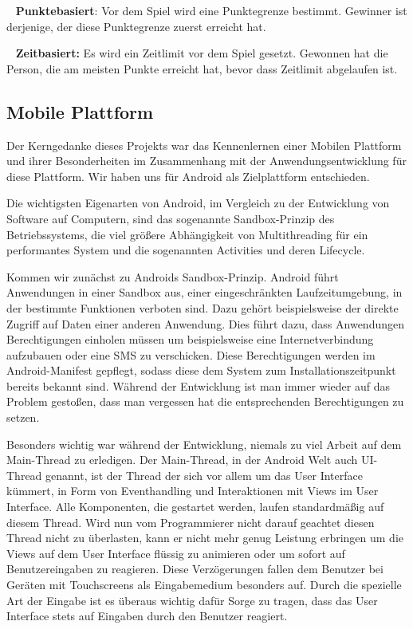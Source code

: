 \documentclass{scrartcl}
\begin{document}
\ \newline
\textbf{Punktebasiert}:
Vor dem Spiel wird eine Punktegrenze bestimmt. Gewinner ist derjenige, der diese
Punktegrenze zuerst erreicht hat.

\ \newline
\textbf{Zeitbasiert:}
Es wird ein Zeitlimit vor dem Spiel gesetzt. Gewonnen hat die Person, die
am meisten Punkte erreicht hat, bevor dass Zeitlimit abgelaufen ist.

\subsection{Mobile Plattform}
Der Kerngedanke dieses Projekts war das Kennenlernen einer Mobilen Plattform und
ihrer Besonderheiten im Zusammenhang mit der Anwendungsentwicklung für diese
Plattform. Wir haben uns für Android als Zielplattform entschieden.

Die wichtigsten Eigenarten von Android, im Vergleich zu der Entwicklung von
Software auf Computern, sind das sogenannte Sandbox-Prinzip des Betriebssystems,
die viel größere Abhängigkeit von Multithreading für ein performantes System und
die sogenannten Activities und deren Lifecycle.

Kommen wir zunächst zu Androids Sandbox-Prinzip. Android führt Anwendungen in
einer Sandbox aus, einer eingeschränkten Laufzeitumgebung, in der bestimmte
Funktionen verboten sind. Dazu gehört beispielsweise der direkte Zugriff auf
Daten einer anderen Anwendung. Dies führt dazu, dass Anwendungen Berechtigungen
einholen müssen um beispielsweise eine Internetverbindung aufzubauen oder eine
SMS zu verschicken. Diese Berechtigungen werden im Android-Manifest gepflegt,
sodass diese dem System zum Installationszeitpunkt bereits bekannt sind. Während
der Entwicklung ist man immer wieder auf das Problem gestoßen, dass man
vergessen hat die entsprechenden Berechtigungen zu setzen.

Besonders wichtig war während der Entwicklung, niemals zu viel Arbeit auf dem
Main-Thread zu erledigen. Der Main-Thread, in der Android Welt auch UI-Thread
genannt, ist der Thread der sich vor allem um das User Interface kümmert, in Form
von Eventhandling und Interaktionen mit Views im User Interface. Alle
Komponenten, die gestartet werden, laufen standardmäßig auf diesem Thread. Wird
nun vom Programmierer nicht darauf geachtet diesen Thread nicht zu überlasten,
kann er nicht mehr genug Leistung erbringen um die Views auf dem User Interface
flüssig zu animieren oder um sofort auf Benutzereingaben zu reagieren. Diese
Verzögerungen fallen dem Benutzer bei Geräten mit Touchscreens als Eingabemedium
besonders auf. Durch die spezielle Art der Eingabe ist es überaus wichtig dafür
Sorge zu tragen, dass das User Interface stets auf Eingaben durch den Benutzer
reagiert.
\end{document}
